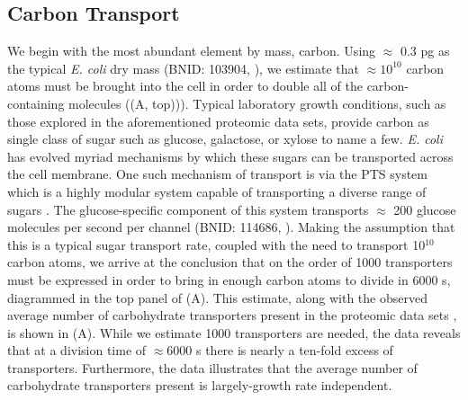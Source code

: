 \subsection{Carbon Transport}
We begin with the most abundant element by mass, carbon. Using $\approx$ 0.3
pg as the typical \textit{E. coli} dry mass (BNID: 103904, \cite{milo2010}),
we estimate that $\approx 10^{10}$ carbon atoms must be brought into the cell
in order to double all of the carbon-containing molecules ((A,
top))). Typical laboratory
growth conditions, such as those explored in the aforementioned proteomic data
sets, provide carbon as single class of sugar such as glucose, galactose, or
xylose to name a few. \textit{E. coli} has evolved myriad mechanisms by which these sugars can
be transported across the cell membrane. One such mechanism of transport is via
the PTS system which is a highly modular system capable of transporting a diverse
range of sugars \citep{escalante2012}. The glucose-specific
component of this system transports $\approx$ 200 glucose
molecules per second per channel (BNID: 114686, \cite{milo2010}). Making the
assumption that this is a typical sugar transport rate, coupled with the
need to transport 10$^{10}$ carbon atoms, we arrive at the conclusion that on the
order of 1000 transporters must be expressed in order to bring in enough carbon
atoms to divide in 6000 s, diagrammed in the top panel of (A). This estimate, along with the observed average number
of carbohydrate transporters present in the proteomic data sets
\citep{schmidt2016, peebo2015,valgepea2013,li2014}, is shown in
(A). While we estimate 1000 transporters are needed, the
data reveals that at a division time of $\approx 6000$ s there is nearly a
ten-fold excess of transporters. Furthermore, the data illustrates that the
average number of carbohydrate transporters present is largely-growth rate
independent.


